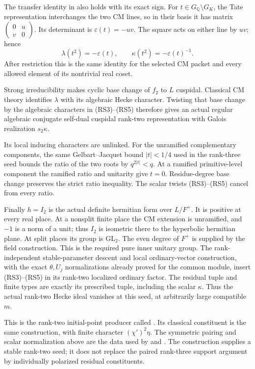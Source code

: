 The transfer identity in 
also holds with its exact sign.
For \(t\in G_{\mathbb Q}\setminus G_K\), the
Tate representation interchanges the two CM
lines, so in their basis it has matrix
\(\left(\begin{smallmatrix}0&u\\v&0\end{smallmatrix}\right)\).
Its determinant is \(\varepsilon(t)=-uv\).
The square acts on either line by \(uv\);
hence
\[
        \lambda(t^2)=-\varepsilon(t),\qquad
        \kappa(t^2)=-\varepsilon(t)^{-1}.                     \tag{RS6}
\]
After restriction this is the same identity
for the selected CM packet and every allowed
element of its nontrivial real coset.


Strong irreducibility makes cyclic base
change of \(f_2\) to \(L\) cuspidal.
Classical CM theory identifies \(\lambda\)
with its algebraic Hecke character.
Twisting that base change by the algebraic
characters in (RS3)--(RS5) therefore gives
an actual regular algebraic conjugate
self-dual cuspidal rank-two representation
with Galois realization \(s_2\kappa\).

Its local inducing characters are unlinked.
For the unramified complementary components,
the same Gelbart--Jacquet bound
\(|t|<1/4\) used in the rank-three seed
bounds the ratio of the two roots by
\(q^{2|t|}<q\).
At a ramified primitive-level component the
ramified ratio and unitarity give \(t=0\).
Residue-degree base change preserves the
strict ratio inequality.
The scalar twists (RS3)--(RS5) cancel
from every ratio.

Finally \(h=I_2\) is the actual definite
hermitian form over \(L/F^+\).
It is positive at every real place.
At a nonsplit finite place the CM
extension is unramified, and \(-1\)
is a norm of a unit; thus \(I_2\)
is isometric there to the hyperbolic
hermitian plane.
At split places its group is
\(\mathrm{GL}_2\).
The even degree of \(F^+\) is supplied
by the field construction.
This is the required pure inner
unitary group.
The rank-independent stable-parameter
descent and local ordinary-vector
construction, with the exact
\(\theta,U_j\) normalizations already
proved for the common module, insert
(RS3)--(RS5) in its rank-two localized
ordinary factor.
The residual tuple and finite types
are exactly its prescribed tuple,
including the scalar \(\kappa\).
Thus the actual rank-two Hecke ideal
vanishes at this seed, at arbitrarily
large compatible \(m\).

This is the rank-two initial-point
producer called .
Its classical constituent is the same
construction, with finite character
\((\chi')^2\eta\).
The symmetric pairing and scalar
normalization above are the data used
by
and .
The construction supplies a stable
rank-two seed; it does not replace
the paired rank-three support
argument by individually polarized
residual constituents.
